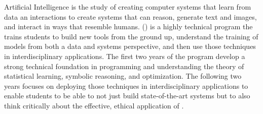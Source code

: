 Artificial Intelligence is the study of creating computer systems that
learn from data an interactions to create systems that can reason,
generate text and images, and interact in ways that resemble humans.
%
\name{} (\short{}) is a highly technical program the trains
students to build new \ai{} tools from the ground up, understand the
training of models from both a data and systems perspective, and then
use those techniques in interdisciplinary applications.
%
The first two years of the program develop a strong technical
foundation in programming and understanding the theory of statistical
learning, symbolic reasoning, and optimization.
%
The following two years focuses on deploying those techniques in
interdisciplinary applications to enable students to be able to not
just build state-of-the-art \ai{} systems but to also think critically
about the effective, ethical application of \ai{}.